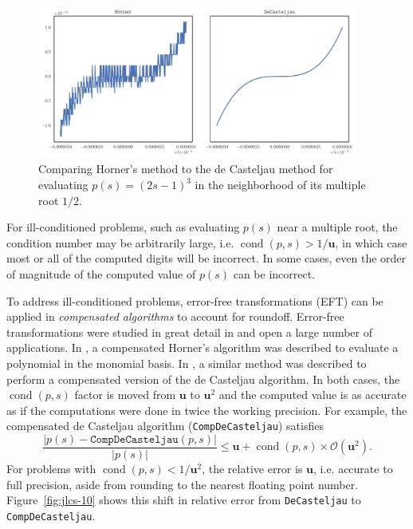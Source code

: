 \documentclass[letterpaper,10pt]{article}
\theoremstyle{definition}
\newcommand{\cond}[1]{\operatorname{cond}\left(#1\right)}
\newcommand{\mach}{\mathbf{u}}
\begin{document}
\begin{figure}
  \includegraphics[width=0.9375\textwidth]{../images/horner_inferior.pdf}
  \centering
  \caption{Comparing Horner's method to the de Casteljau method for
    evaluating \(p(s) = (2s - 1)^3\) in the neighborhood of its
    multiple root \(1/2\).}
  \label{fig:horner-inferior}
\end{figure}

For ill-conditioned problems, such as evaluating \(p(s)\) near a
multiple root, the condition number may be arbitrarily large, i.e.
\(\cond{p, s} > 1 / \mach\), in
which case most or all of the computed digits will be incorrect.
In some cases, even the order of magnitude of the computed value
of \(p(s)\) can be incorrect.

To address ill-conditioned problems, error-free transformations (EFT) can
be applied in \textit{compensated algorithms} to account for roundoff.
Error-free transformations were studied in great detail in \cite{Ogita2005}
and open a large number of applications.
In \cite{langlois_et_al:DSP:2006:442}, a compensated Horner's algorithm was
described to evaluate a polynomial in the monomial basis. In \cite{Jiang2010},
a similar method was described to perform a compensated version of the de
Casteljau algorithm. In both cases, the \(\cond{p, s}\) factor is moved
from \(\mach\) to \(\mach^2\) and the computed value is as accurate
as if the computations were done in twice the working precision. For example,
the compensated de Casteljau algorithm (\texttt{CompDeCasteljau}) satisfies
\begin{equation}\label{de-casteljau-2-error}
  \frac{\left|p(s) - \mathtt{CompDeCasteljau}(p, s)\right|}{
    \left|p(s)\right|} \leq \mach + \cond{p, s} \times
    \mathcal{O}\left(\mach^2\right).
\end{equation}
For problems with \(\cond{p, s} < 1 / \mach^2\), the relative error
is \(\mach\), i.e. accurate to full precision, aside from rounding to the
nearest floating point number. Figure~\ref{fig:jlcs-10} shows this shift
in relative error from \texttt{DeCasteljau} to \texttt{CompDeCasteljau}.
\end{document}
